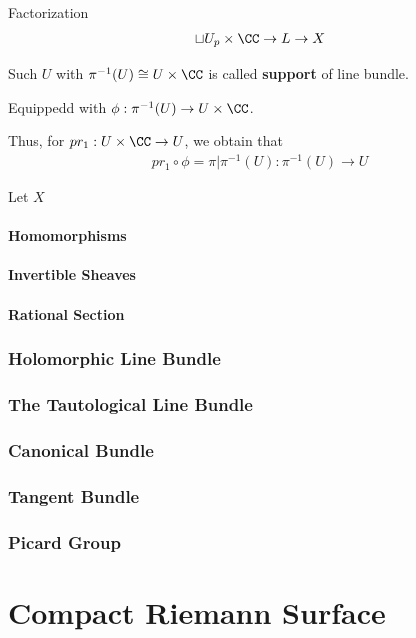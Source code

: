 \documentclass[Total.tex]{subfiles}
\begin{document}
			Factorization
			\begin{gather*}
				\sqcup U_p\times \CC\rightarrow L\rightarrow X
			\end{gather*}
			
			\begin{Def}
				Such $U$ with $\pi^{-1}(U)\cong U\times \CC$ is called \textbf{support} of line bundle.
				
				Equippedd with $\phi:\pi^{-1}(U)\rightarrow U\times \CC$. 
			\end{Def}
			
			Thus, for $pr_1:U\times \CC\rightarrow U$, we obtain that
			\begin{gather*}
				pr_1\circ \phi=\pi|\pi^{-1}(U):\pi^{-1}(U)\rightarrow U
			\end{gather*}
			
			\begin{Def}
				Let $X$ 
			\end{Def}
		\subsubsection{Homomorphisms}
		\subsubsection{Invertible Sheaves}
		\subsubsection{Rational Section}
		\subsection{Holomorphic Line Bundle}
		\subsection{The Tautological Line Bundle}
		\subsection{Canonical Bundle}
		\subsection{Tangent Bundle}	
		\subsection{Picard Group}
	\chapter{Compact Riemann Surface}
\end{document}
